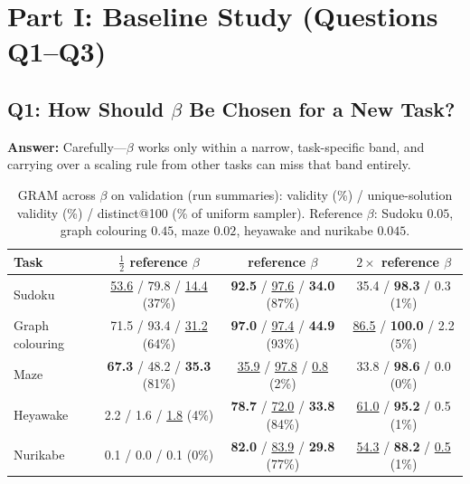 \documentclass[11pt]{article}
\newcommand{\secbest}[1]{\underline{#1}}
\begin{document}
\section{Part I: Baseline Study (Questions Q1--Q3)}
\label{sec:baseline}

\subsection{Q1: How Should $\beta$ Be Chosen for a New Task?}
\textbf{Answer:} Carefully---$\beta$ works only within a narrow, task-specific band, and carrying over a scaling rule from other tasks can miss that band entirely.

\begin{table}[!ht]
  \centering
  \small
  \begin{tabular}{@{}lccc@{}}
    \toprule
    \textbf{Task} & \textbf{$\frac{1}{2}$ reference $\beta$} & \textbf{reference $\beta$} & \textbf{$2\times$ reference $\beta$} \\
    \midrule
    Sudoku & \secbest{53.6} / 79.8 / \secbest{14.4} (37\%) & \textbf{92.5} / \secbest{97.6} / \textbf{34.0} (87\%) & 35.4 / \textbf{98.3} / 0.3 (1\%) \\
    Graph colouring & 71.5 / 93.4 / \secbest{31.2} (64\%) & \textbf{97.0} / \secbest{97.4} / \textbf{44.9} (93\%) & \secbest{86.5} / \textbf{100.0} / 2.2 (5\%) \\
    Maze & \textbf{67.3} / 48.2 / \textbf{35.3} (81\%) & \secbest{35.9} / \secbest{97.8} / \secbest{0.8} (2\%) & 33.8 / \textbf{98.6} / 0.0 (0\%) \\
    Heyawake & 2.2 / 1.6 / \secbest{1.8} (4\%) & \textbf{78.7} / \secbest{72.0} / \textbf{33.8} (84\%) & \secbest{61.0} / \textbf{95.2} / 0.5 (1\%) \\
    Nurikabe & 0.1 / 0.0 / 0.1 (0\%) & \textbf{82.0} / \secbest{83.9} / \textbf{29.8} (77\%) & \secbest{54.3} / \textbf{88.2} / \secbest{0.5} (1\%) \\
    \bottomrule
  \end{tabular}
  \caption{GRAM across $\beta$ on validation (run summaries): validity (\%) / unique-solution validity (\%) / distinct@100 (\% of uniform sampler). Reference $\beta$: Sudoku $0.05$, graph colouring $0.45$, maze $0.02$, heyawake and nurikabe $0.045$.}
  \label{tab:beta}
\end{table}
\end{document}
